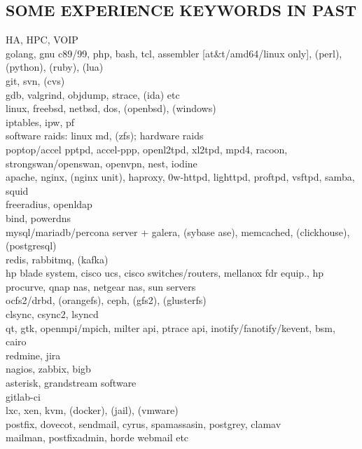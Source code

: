 \begin{resume}
\section{SOME EXPERIENCE KEYWORDS IN PAST}
\vspace{0.1in} 
    HA, HPC, VOIP\\
    golang, gnu c89/99, php, bash, tcl, assembler [at\&t/amd64/linux only], (perl), (python), (ruby), (lua)\\
    git, svn, (cvs)\\
    gdb, valgrind, objdump, strace, (ida) etc\\
    linux, freebsd, netbsd, dos, (openbsd), (windows)\\
    iptables, ipw, pf\\
    software raids: linux md, (zfs); hardware raids\\
    poptop/accel pptpd, accel-ppp, openl2tpd, xl2tpd, mpd4, racoon, strongswan/openswan, openvpn, nest, iodine\\
    apache, nginx, (nginx unit), haproxy, 0w-httpd, lighttpd, proftpd, vsftpd, samba, squid\\
    freeradius, openldap\\
    bind, powerdns\\
    mysql/mariadb/percona server + galera, (sybase ase), memcached, (clickhouse), (postgresql)\\
    redis, rabbitmq, (kafka)\\
    hp blade system, cisco ucs, cisco switches/routers, mellanox fdr equip., hp procurve, qnap nas, netgear nas, sun servers\\
    ocfs2/drbd, (orangefs), ceph, (gfs2), (glusterfs)\\
    clsync, csync2, lsyncd\\
    qt, gtk, openmpi/mpich, milter api, ptrace api, inotify/fanotify/kevent, bsm, cairo\\
    redmine, jira\\
    nagios, zabbix, bigb\\
    asterisk, grandstream software\\
    gitlab-ci\\
    lxc, xen, kvm, (docker), (jail), (vmware)\\
    postfix, dovecot, sendmail, cyrus, spamassasin, postgrey, clamav\\
    mailman, postfixadmin, horde webmail etc\\

\end{resume}
